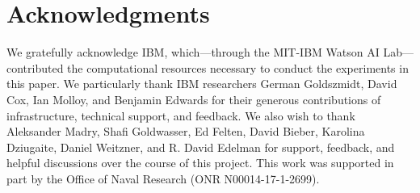 \section{Acknowledgments}

We gratefully acknowledge IBM, which---through the MIT-IBM Watson AI Lab---contributed the computational resources necessary to conduct the experiments in this paper.
We particularly thank IBM researchers German Goldszmidt, David Cox, Ian Molloy, and Benjamin Edwards for their generous contributions of infrastructure, technical support, and feedback.
We also wish to thank Aleksander Madry, Shafi Goldwasser, Ed Felten, David Bieber, Karolina Dziugaite, Daniel Weitzner, and R. David Edelman for support, feedback, and helpful discussions over the course of this project.
This work was supported in part by the Office of Naval Research (ONR N00014-17-1-2699).